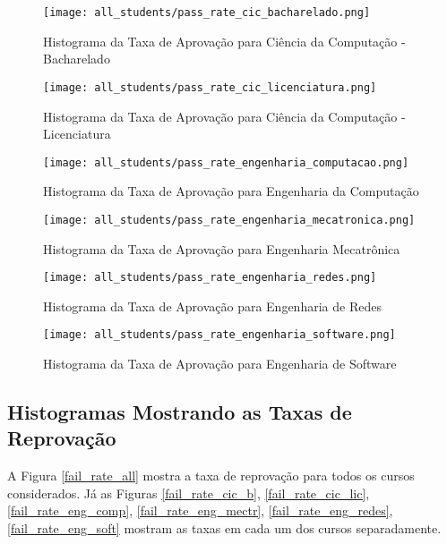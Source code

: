 \begin{figure}[!ht]
    \caption{Histograma da Taxa de Aprovação para Ciência da Computação - Bacharelado}
    \centering
    \texttt{[image: all\_students/pass\_rate\_cic\_bacharelado.png]}
    \label{pass_rate_cic_b}
\end{figure}

\begin{figure}[!ht]
    \caption{Histograma da Taxa de Aprovação para Ciência da Computação -
    Licenciatura}
    \centering
    \texttt{[image: all\_students/pass\_rate\_cic\_licenciatura.png]}
    \label{pass_rate_cic_lic}
\end{figure}

\begin{figure}[!ht]
    \caption{Histograma da Taxa de Aprovação para Engenharia da Computação}
    \centering
    \texttt{[image: all\_students/pass\_rate\_engenharia\_computacao.png]}
    \label{pass_rate_eng_comp}
\end{figure}

\begin{figure}[!ht]
    \caption{Histograma da Taxa de Aprovação para Engenharia Mecatrônica}
    \centering
    \texttt{[image: all\_students/pass\_rate\_engenharia\_mecatronica.png]}
    \label{pass_rate_eng_mectr}
\end{figure}

\begin{figure}[!ht]
    \caption{Histograma da Taxa de Aprovação para Engenharia de Redes}
    \centering
    \texttt{[image: all\_students/pass\_rate\_engenharia\_redes.png]}
    \label{pass_rate_eng_redes}
\end{figure}

\begin{figure}[!ht]
    \caption{Histograma da Taxa de Aprovação para Engenharia de Software}
    \centering
    \texttt{[image: all\_students/pass\_rate\_engenharia\_software.png]}
    \label{pass_rate_eng_soft}
\end{figure}

\clearpage

\subsection{Histogramas Mostrando as Taxas de Reprovação}
A Figura \ref{fail_rate_all} mostra a taxa de reprovação para todos os cursos
considerados. 
Já as Figuras \ref{fail_rate_cic_b}, \ref{fail_rate_cic_lic},
\ref{fail_rate_eng_comp}, \ref{fail_rate_eng_mectr}, \ref{fail_rate_eng_redes},
\ref{fail_rate_eng_soft} mostram as taxas em cada um dos cursos separadamente. 


